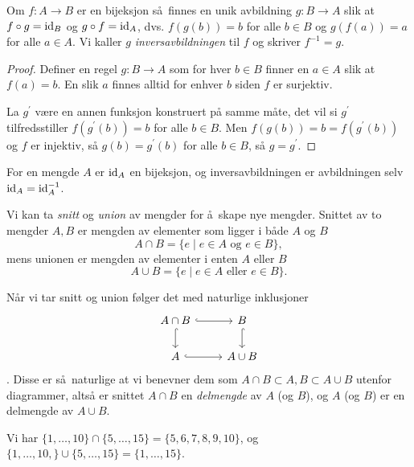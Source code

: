 \begin{lemma}\label{thm:set-inverse-function}
    Om $f\colon A\to B$ er en bijeksjon så finnes en unik avbildning
    $g\colon B\to A$ slik at $f\circ g = \operatorname{id}_B$ og $g\circ f = \operatorname{id}_A$,
    dvs.
    $f(g(b)) = b$ for alle $b\in B$ og $g(f(a)) = a$ for alle $a\in A$.
    Vi kaller $g$ \textit{inversavbildningen} til $f$ og skriver $f^{-1} = g$.
\end{lemma}
\begin{proof}
    Definer en regel $g\colon B\to A$ som for hver $b\in B$ finner en $a\in A$
    slik at $f(a) = b$.
    En slik $a$ finnes alltid for enhver $b$ siden $f$ er surjektiv.

    La $g^\prime$ være en annen funksjon konstruert på samme måte,
    det vil si $g^\prime$ tilfredsstiller $f(g^\prime(b)) = b$ for alle $b\in B$.
    Men $f(g(b)) = b = f(g^\prime(b))$ og $f$ er injektiv, så $g(b) = g^\prime(b)$
    for alle $b\in B$, så $g = g^\prime$.
\end{proof}

\begin{example}
    For en mengde $A$ er $\operatorname{id}_A$ en bijeksjon,
    og inversavbildningen er avbildningen selv $\operatorname{id}_A = \operatorname{id}_A^{-1}$.
\end{example}

\begin{example}
    Vi kan ta \textit{snitt} og \textit{union} av mengder for å skape nye mengder.
    Snittet av to mengder $A,B$ er mengden av elementer som ligger i både $A$ og $B$
    \[
        A\cap B = \{ e\mid e\in A\mbox{ og } e\in B\},
    \]
    mens unionen er mengden av elementer i enten $A$ eller $B$
    \[
        A\cup B = \{ e\mid e\in A\mbox{ eller } e\in B\}.
    \]

    Når vi tar snitt og union følger det med naturlige inklusjoner
    \[\begin{tikzcd}
        A\cap B
        \rar[hook]
        \dar[hook]
        & B
        \dar[hook]
        \\
        A
        \rar[hook]
        &
        A\cup B
    \end{tikzcd}\].
    Disse er så naturlige at vi benevner dem som $A\cap B\subset A,B\subset A\cup B$
    utenfor diagrammer, altså er snittet $A\cap B$
    en \textit{delmengde} av $A$ (og $B$),
    og $A$ (og $B$) er en delmengde av $A\cup B$.
\end{example}

\begin{example}
    Vi har $\{1,\dots,10\}\cap \{5,\dots,15\} = \{5, 6, 7, 8, 9, 10\}$,
    og $\{1,\dots, 10,\}\cup \{5,\dots, 15\} = \{1,\dots, 15\}$.
\end{example}

